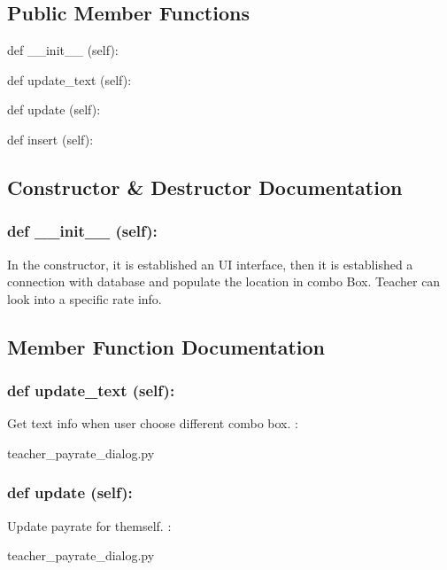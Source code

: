 \subsection*{Public Member Functions}
\begin{DoxyCompactItemize}
\item 
def {\_\_init\_\_} (self):
\item 
def {update\_text} (self):
\item 
def {update} (self):
\item 
def {insert} (self):
\end{DoxyCompactItemize}

\subsection{Constructor \& Destructor Documentation}
\hypertarget{class_poly_aa3def076b74bed67904976ad4f9fe9b1}{
\subsubsection[{def __init__ (self):}]{\setlength{\rightskip}{0pt plus 5cm}def {\_\_init\_\_} (self): 
}}
In the constructor, it is established an UI interface, then it is  established a connection with database and populate the location in combo Box. Teacher can look into a specific rate info.
 

\subsection{Member Function Documentation}
\hypertarget{class_poly_a14a7ad77ce612b0c54f531d307ee4b39}{
\subsubsection[{def update_text (self):}]{\setlength{\rightskip}{0pt plus 5cm}def {update\_text} (self):}}\label{class_poly_a14a7ad77ce612b0c54f531d307ee4b39}
Get text info when user choose different combo box.
:\begin{DoxyCompactItemize}
\item 
teacher\_payrate\_dialog.\-py\end{DoxyCompactItemize}

\hypertarget{class_poly_a14a7ad77ce612b0c54f531d307ee4b39}{
\subsubsection[{def update (self):}]{\setlength{\rightskip}{0pt plus 5cm}def {update} (self):}}\label{class_poly_a14a7ad77ce612b0c54f531d307ee4b39}
Update payrate for themself.
:\begin{DoxyCompactItemize}
\item 
teacher\_payrate\_dialog.\-py\end{DoxyCompactItemize}

